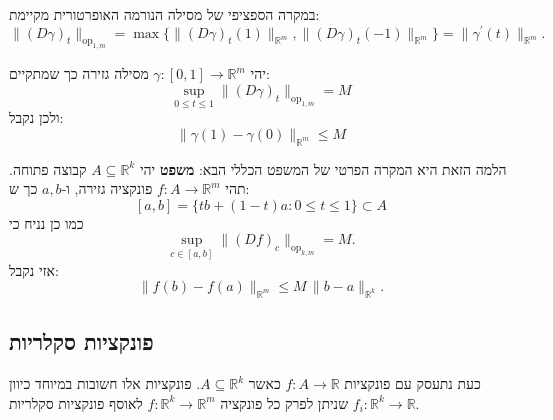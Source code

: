 \documentclass{tstextbook}
\begin{document}
\begin{remark}
במקרה הספציפי של מסילה הנורמה האופרטורית מקיימת:
$$\|(D\gamma)_{t}\|_{\mathrm{op}_{1,m}}=\operatorname*{max}\{\|(D\gamma)_{t}(1)\|_{\mathbb{R}^{m}},\|(D\gamma)_{t}(-1)\|_{\mathbb{R}^{m}}\}=\|\gamma^{\prime}(t)\|_{\mathbb{R}^{m}}.$$

\end{remark}
\begin{lemma}
יהי \(\gamma:[0,1]\to\mathbb{R}^m\) מסילה גזירה כך שמתקיים:
$$\operatorname*{sup}_{0\leq t\leq1}\|(D\gamma)_{t}\|_{\mathrm{op}_{1,m}}=M$$
ולכן נקבל:
$$\|\gamma(1)-\gamma(0)\|_{\mathbb{R}^{m}}\leq M$$

\end{lemma}
הלמה הזאת היא המקרה הפרטי של המשפט הכללי הבא:
\textbf{משפט}
יהי \(A\subseteq \mathbb{R}^k\) קבוצה פתוחה. תהי \(f:A\to\mathbb{R}^m\) פונקציה גזירה, ו-\(a,b\) כך ש:
$$[a,b]=\{t b+(1-t)a\colon0\leq t\leq1\}\subset A$$
כמו כן נניח כי
$$\operatorname*{sup}_{c\in[a,b]}\|(D f)_{c}\|_{\mathrm{op}_{k,m}}=M.$$
אזי נקבל:
$$\|f(b)-f(a)\|_{\mathbb{R}^{m}}\leq M\,\|b-a\|_{\mathbb{R}^{k}}.$$

\subsection{פונקציות סקלריות}

כעת נתעסק עם פונקציות \(f:A\to \mathbb{R}\) כאשר \(A\subseteq \mathbb{R}^k\). פונקציות אלו חשובות במיוחד כיוון שניתן לפרק כל פונקציה \(f:\mathbb{R}^k\to\mathbb{R}^m\) לאוסף פונקציות סקלריות \(f_{i}:\mathbb{R}^k\to\mathbb{R}\).
\end{document}
